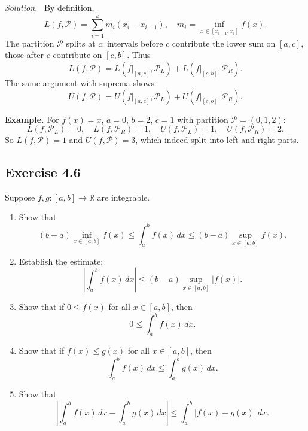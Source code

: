 \documentclass[11pt,a4paper]{article}
\newenvironment{solution}{\par\noindent\textit{Solution.}\ }{\par\vspace{0.5em}}
\begin{document}
\begin{solution}
	By definition,
	\[
	L(f,\mathcal{P}) = \sum_{i=1}^k m_i (x_i-x_{i-1}), \quad 
	m_i = \inf_{x\in[x_{i-1},x_i]} f(x).
	\]
	The partition $\mathcal{P}$ splits at $c$: intervals before $c$ contribute the lower sum on $[a,c]$, 
	those after $c$ contribute on $[c,b]$. Thus
	\[
	L(f,\mathcal{P}) = L(f|_{[a,c]},\mathcal{P}_L) + L(f|_{[c,b]},\mathcal{P}_R).
	\]
	The same argument with suprema shows
	\[
	U(f,\mathcal{P}) = U(f|_{[a,c]},\mathcal{P}_L) + U(f|_{[c,b]},\mathcal{P}_R).
	\]
	
	\textbf{Example.} For $f(x)=x$, $a=0$, $b=2$, $c=1$ with partition $\mathcal{P}=(0,1,2)$:
	\[
	L(f,\mathcal{P}_L)=0, \quad L(f,\mathcal{P}_R)=1, \quad
	U(f,\mathcal{P}_L)=1, \quad U(f,\mathcal{P}_R)=2.
	\]
	So $L(f,\mathcal{P})=1$ and $U(f,\mathcal{P})=3$, which indeed split into left and right parts.
\end{solution}


\subsection*{Exercise 4.6}
Suppose $f,g:[a,b]\to\mathbb{R}$ are integrable. 

\begin{enumerate}[label=\alph*)]
	\item Show that
	\[
	(b-a)\inf_{x\in[a,b]} f(x) \leq \int_a^b f(x)\,dx \leq (b-a)\sup_{x\in[a,b]} f(x).
	\]
	
	\item Establish the estimate:
	\[
	\left|\int_a^b f(x)\,dx\right| \leq (b-a)\sup_{x\in[a,b]} |f(x)|.
	\]
	
	\item Show that if $0 \leq f(x)$ for all $x \in [a,b]$, then
	\[
	0 \leq \int_a^b f(x)\,dx.
	\]
	
	\item Show that if $f(x)\leq g(x)$ for all $x \in [a,b]$, then
	\[
	\int_a^b f(x)\,dx \leq \int_a^b g(x)\,dx.
	\]
	
	\item Show that
	\[
	\left|\int_a^b f(x)\,dx - \int_a^b g(x)\,dx\right| \leq \int_a^b |f(x)-g(x)|\,dx.
	\]
\end{enumerate}
\end{document}
